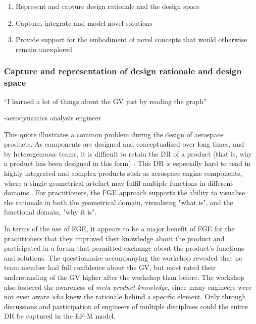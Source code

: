 \documentclass[aerospace,article,submit,moreauthors,pdftex]{Definitions/mdpi}
\begin{document}
\begin{enumerate}
	\item Represent and capture design rationale and the design space
	\item Capture, integrate and model novel solutions
	\item Provide support for the embodiment of novel concepts that would otherwise remain unexplored
\end{enumerate}

\subsubsection{Capture and representation of design rationale and design space}

\begin{center}
    “I learned a lot of things about the GV just by reading the graph” 
\end{center}
\begin{flushright}
    -aerodynamics analysis engineer
\end{flushright}


This quote illustrates a common problem during the design of aerospace products.
As components are designed and conceptualised over long times, and by heterogenuous teams, it is difficult to retain the \acf{DR} of a product (that is, why a product has been designed in this form) \citep{Bracewell2009}. 
This \ac{DR} is especially hard to read in highly integrated and complex products such as aerospace engine components, where a single geometrical artefact may fulfil multiple functions in different domains \cite{Raja2019}.
For practitioners, the FGE approach supports the ability to visualise the rationale in both the geometrical domain, visualising "what is", and the functional domain, "why it is".

In terms of the use of \ac{FGE}, it appears to be a major benefit of FGE for the practitioners that they improved their knowledge about the product and participated in a forum that permitted exchange about the product's functions and solutions.
The questionnaire accompanying the workshop revealed that no team member had full confidence about the \ac{GV}, but most rated their understanding of the GV higher after the workshop than before.
The workshop also fostered the awareness of \textit{meta-product-knowledge}, since many engineers were not even aware \textit{who} knew the rationale behind a specific element.
Only through discussions and participation of engineers of multiple disciplines could the entire DR be captured in the EF-M model.
\end{document}
